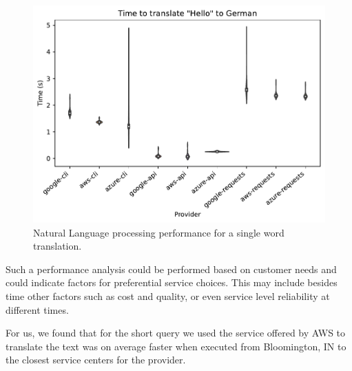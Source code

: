 \begin{figure}[htb]

\centering
\includegraphics[width=1.0\columnwidth]{images/nlp-benchmark.pdf}

\caption{Natural Language processing performance for a single
         word translation.}
\label{fig:nlp-performance}

\end{figure}


Such a performance analysis could be performed based on customer needs
and could indicate factors for preferential service choices. This may
include besides time other factors such as cost and quality, or even
service level reliability at different times.

For us, we found that for the short query we used the service
offered by AWS to translate the text was on average 
faster when executed from Bloomington, IN to the closest service
centers for the provider.


